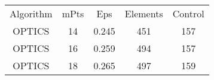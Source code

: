 \begin{table}
\begin{tabular}{ccccc}
Algorithm & mPts & Eps & Elements & Control \\
OPTICS & 14 & 0.245 & 451 & 157 \\
OPTICS & 16 & 0.259 & 494 & 157 \\
OPTICS & 18 & 0.265 & 497 & 159 \\
\end{tabular}
\end{table}
